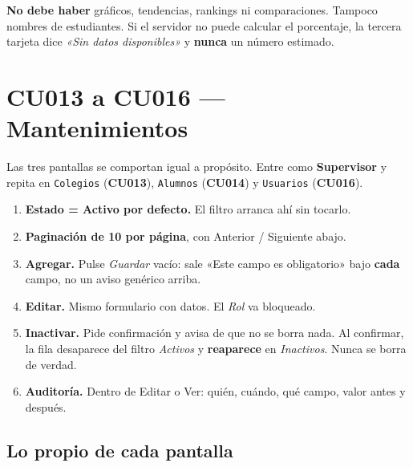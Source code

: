 \documentclass[11pt,a4paper]{article}
\newcommand{\paso}[1]{\textbf{#1}}
\newcommand{\ruta}[1]{\textcolor{azulmarino}{\texttt{#1}}}
\newcommand{\cu}[1]{\textbf{CU#1}}
\begin{document}
\textbf{No debe haber} gráficos, tendencias, rankings ni comparaciones. Tampoco
nombres de estudiantes. Si el servidor no puede calcular el porcentaje, la
tercera tarjeta dice \emph{«Sin datos disponibles»} y \textbf{nunca} un número
estimado.

\newpage
\section{CU013 a CU016 --- Mantenimientos}

Las tres pantallas se comportan igual a propósito. Entre como \textbf{Supervisor}
y repita en \ruta{Colegios} (\cu{013}), \ruta{Alumnos} (\cu{014}) y
\ruta{Usuarios} (\cu{016}).

\begin{enumerate}
  \item \paso{Estado = Activo por defecto.} El filtro arranca ahí sin tocarlo.
  \item \paso{Paginación de 10 por página}, con Anterior / Siguiente abajo.
  \item \paso{Agregar.} Pulse \emph{Guardar} vacío: sale «Este campo es
        obligatorio» bajo \textbf{cada} campo, no un aviso genérico arriba.
  \item \paso{Editar.} Mismo formulario con datos. El \emph{Rol} va bloqueado.
  \item \paso{Inactivar.} Pide confirmación y avisa de que no se borra nada.
        Al confirmar, la fila desaparece del filtro \emph{Activos} y
        \textbf{reaparece} en \emph{Inactivos}. Nunca se borra de verdad.
  \item \paso{Auditoría.} Dentro de Editar o Ver: quién, cuándo, qué campo,
        valor antes y después.
\end{enumerate}

\subsection{Lo propio de cada pantalla}
\end{document}
